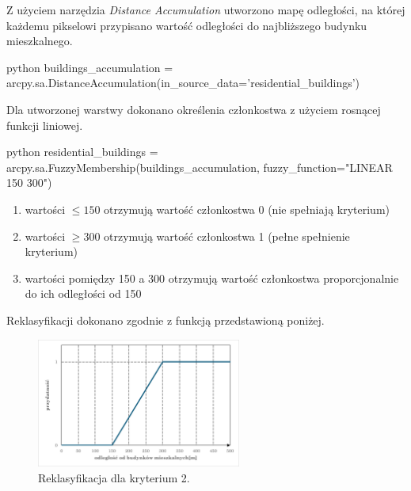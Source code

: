 \documentclass{article}
\begin{document}
Z użyciem narzędzia \textit{Distance Accumulation} utworzono mapę odległości, na której każdemu pikselowi przypisano wartość odległości do najbliższego budynku mieszkalnego.

\vspace{5pt}

\begin{mintedbox}{python}
buildings_accumulation = arcpy.sa.DistanceAccumulation(in_source_data='residential_buildings')
\end{mintedbox}
\vspace{10pt}

Dla utworzonej warstwy dokonano określenia członkostwa z użyciem rosnącej funkcji liniowej.

\begin{mintedbox}{python}
residential_buildings = arcpy.sa.FuzzyMembership(buildings_accumulation, fuzzy_function="LINEAR 150 300")
\end{mintedbox}

\vspace{5pt}

\begin{enumerate}[label=•]
    \item wartości \( \leq 150 \) otrzymują wartość członkostwa 0 (nie spełniają kryterium)
    \item wartości \( \geq 300 \) otrzymują wartość członkostwa 1 (pełne spełnienie kryterium)
    \item wartości pomiędzy 150 a 300 otrzymują wartość członkostwa proporcjonalnie do ich odległości od 150
\end{enumerate}
\vspace{10pt}

Reklasyfikacji dokonano zgodnie z funkcją przedstawioną poniżej.
\vspace{5pt}

\begin{figure}[H]
    \centering
    \includegraphics[width=0.6\textwidth]{img/kryterium2-wykres-glowny.png}
    \caption{Reklasyfikacja dla kryterium 2.}
\end{figure}
\end{document}
